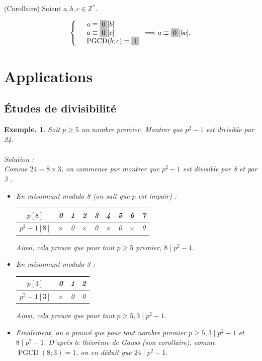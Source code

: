\documentclass[12pt]{article}
\newcommand{\hideM}[1]{\mbox{\vphantom{$#1$}\smash{\colorbox{gray!50}{$\displaystyle #1$}}} }
\theoremstyle{break}
\newtheorem*{example}{Exemple.}
\begin{document}
\begin{proposition}{(Corollaire)}{}
Soient $a, b, c \in \mathbb{Z}^{*}$.

$$
\left\{
\begin{array}{rl}
& a \equiv \hideM{0}[b] \\
& a \equiv \hideM{0}[c] \\
& \operatorname{PGCD}(b ; c)=\hideM{1}
\end{array} \Longrightarrow a \equiv \hideM{0}[b c] .
\right.
$$
\end{proposition}

\newpage
\section{Applications}
\subsection{Études de divisibilité}
\begin{example}
Soit $p \geqslant 5$ un nombre premier. Montrer que $p^{2}-1$ est divisible par 24.\\
~\\Solution :\\
Comme $24=8 \times 3$, on commence par montrer que $p^{2}-1$ est divisible par 8 et par 3 .

\begin{itemize}[noitemsep,topsep=0pt]
  \item En raisonnant modulo 8 (on sait que $p$ est impair) :

\begin{center}
\begin{tabular}{|c|c|c|c|c|c|c|c|c|}
\hline
$p[8]$ & 0 & 1 & 2 & 3 & 4 & 5 & 6 & 7 \\
\hline
$p^{2}-1[8]$ & $\times$ & 0 & $\times$ & 0 & $\times$ & 0 & $\times$ & 0 \\
\hline
\end{tabular}
\end{center}

Ainsi, cela prouve que pour tout $p \geqslant 5$ premier, $8 \mid p^{2}-1$.

  \item En raisonnant modulo 3 :

\begin{center}
\begin{tabular}{|c|c|c|c|}
\hline
$p[3]$ & 0 & 1 & 2 \\
\hline
$p^{2}-1[3]$ & $\times$ & 0 & 0 \\
\hline
\end{tabular}
\end{center}

Ainsi, cela prouve que pour tout $p \geqslant 5,3 \mid p^{2}-1$.

  \item Finalement, on a prouvé que pour tout nombre premier $p \geqslant 5,3 \mid p^{2}-1$ et $8 \mid p^{2}-1$. D'après le théorème de Gauss (son corollaire), comme $\operatorname{PGCD}(8 ; 3)=1$, on en déduit que $24 \mid p^{2}-1$.
\end{itemize}
\end{example}
\end{document}
